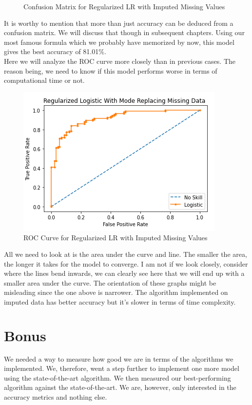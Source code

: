 \begin{itemize}
\begin{figure}[H]
\begin{center}
        \end{center}
        \caption{Confusion Matrix for Regularized LR with Imputed Missing Values}
    \end{figure}
    It is worthy to mention that more than just accuracy can be deduced from a confusion matrix. We will discuss that though in subsequent chapters. Using our most famous formula which we probably have memorized by now, this model gives the best accuracy of 81.01\%. 
    \\
    Here we will analyze the ROC curve more closely than in previous cases. The reason being, we need to know if this model performs worse in terms of computational time or not.
    \begin{figure}[H]
        \begin{center}
            \includegraphics[scale=0.6]{Images/RR_ROC.png}
        \end{center}
        \caption{ROC Curve for Regularized LR with Imputed Missing Values}
    \end{figure}
    All we need to look at is the area under the curve and line. The smaller the area, the longer it takes for the model to converge. I am not if we look closely, consider where the lines bend inwards, we can clearly see here that we will end up with a smaller area under the curve. The orientation of these graphs might be misleading since the one above is narrower. The algorithm implemented on imputed data has better accuracy but it's slower in terms of time complexity. 
\end{itemize}

\section{Bonus}
We needed a way to measure how good we are in terms of the algorithms we implemented. We, therefore, went a step further to implement one more model using the state-of-the-art algorithm. We then measured our best-performing algorithm against the state-of-the-art. We are, however, only interested in the accuracy metrics and nothing else.

